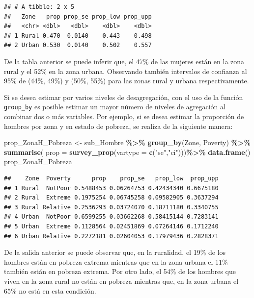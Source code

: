 \documentclass[
  spanish,
  12pt,
]{book}
\newenvironment{Shaded}{\begin{snugshade}}{\end{snugshade}}
\newcommand{\AttributeTok}[1]{\textcolor[rgb]{0.13,0.29,0.53}{#1}}
\newcommand{\FunctionTok}[1]{\textcolor[rgb]{0.13,0.29,0.53}{\textbf{#1}}}
\newcommand{\NormalTok}[1]{#1}
\newcommand{\OtherTok}[1]{\textcolor[rgb]{0.56,0.35,0.01}{#1}}
\newcommand{\SpecialCharTok}[1]{\textcolor[rgb]{0.81,0.36,0.00}{\textbf{#1}}}
\newcommand{\StringTok}[1]{\textcolor[rgb]{0.31,0.60,0.02}{#1}}
\begin{document}
\begin{verbatim}
## # A tibble: 2 x 5
##   Zone   prop prop_se prop_low prop_upp
##   <chr> <dbl>   <dbl>    <dbl>    <dbl>
## 1 Rural 0.470  0.0140    0.443    0.498
## 2 Urban 0.530  0.0140    0.502    0.557
\end{verbatim}

De la tabla anterior se puede inferir que, el 47\% de las mujeres están en la zona rural y el 52\% en la zona urbana. Observando también intervalos de confianza al 95\% de (44\%, 49\%) y (50\%, 55\%) para las zonas rural y urbana respectivamente.

Si se desea estimar por varios niveles de desagregación, con el uso de la función \texttt{group\_by} es posible estimar un mayor número de niveles de agregación al combinar dos o más variables. Por ejemplo, si se desea estimar la proporción de hombres por zona y en estado de pobreza, se realiza de la siguiente manera:

\begin{Shaded}
\begin{Highlighting}[]
\NormalTok{prop\_ZonaH\_Pobreza }\OtherTok{\textless{}{-}}\NormalTok{ sub\_Hombre }\SpecialCharTok{\%\textgreater{}\%}
                      \FunctionTok{group\_by}\NormalTok{(Zone, Poverty) }\SpecialCharTok{\%\textgreater{}\%} 
                      \FunctionTok{summarise}\NormalTok{(}
                      \AttributeTok{prop =} \FunctionTok{survey\_prop}\NormalTok{(}\AttributeTok{vartype =} \FunctionTok{c}\NormalTok{(}\StringTok{"se"}\NormalTok{,}\StringTok{"ci"}\NormalTok{)))}\SpecialCharTok{\%\textgreater{}\%}
                      \FunctionTok{data.frame}\NormalTok{()}
\NormalTok{prop\_ZonaH\_Pobreza}
\end{Highlighting}
\end{Shaded}

\begin{verbatim}
##    Zone  Poverty      prop    prop_se   prop_low  prop_upp
## 1 Rural  NotPoor 0.5488453 0.06264753 0.42434340 0.6675180
## 2 Rural  Extreme 0.1975254 0.06745258 0.09582905 0.3637294
## 3 Rural Relative 0.2536293 0.03724070 0.18711180 0.3340755
## 4 Urban  NotPoor 0.6599255 0.03662268 0.58415144 0.7283141
## 5 Urban  Extreme 0.1128564 0.02451869 0.07264146 0.1712240
## 6 Urban Relative 0.2272181 0.02604053 0.17979436 0.2828371
\end{verbatim}

De la salida anterior se puede observar que, en la ruralidad, el 19\% de los hombres están en pobreza extrema mientras que en la zona urbana el 11\% también están en pobreza extrema. Por otro lado, el 54\% de los hombres que viven en la zona rural no están en pobreza mientras que, en la zona urbana el 65\% no está en esta condición.
\end{document}
